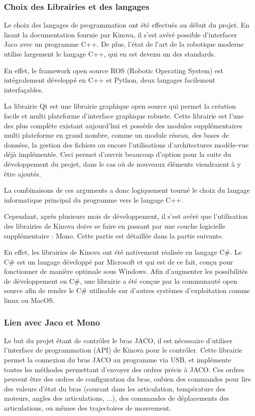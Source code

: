 \documentclass[letterpaper, twoside, 12pt, memoire, creativecommons, hyperref]{thETS}
\begin{document}
\subsubsection{Choix des Librairies et des langages}

Le choix des langages de programmation ont été effectués au début du projet. En lisant la documentation fournie par Kinova, il s'est avéré possible d'interfacer Jaco avec un programme C++. De plus, l'état de l'art de la robotique moderne utilise largement le langage C++, qui en est devenu un des standards. 

En effet, le framework open source ROS (Robotic Operating System) est intégralement développé en C++ et Python, deux langages facilement interfaçables. 

La librairie Qt est une librairie graphique open source qui permet la création facile et multi plateforme d'interface graphique robuste. Cette librairie est l'une des plus complète existant aujourd'hui et possède des modules supplémentaires multi plateforme en grand nombre, comme un module réseau, des bases de données, la gestion des fichiers ou encore l'utilisations d'architectures modèle-vue déjà implémentés. Ceci permet d'ouvrir beaucoup d'option pour la suite du développement du projet, dans le cas où de nouveaux éléments viendraient à y être ajoutés. 

La combinaisons de ces arguments a donc logiquement tourné le choix du langage informatique principal du programme vers le langage C++.

Cependant, après plusieurs mois de développement, il s'est avéré que l'utilisation des librairies de Kinova doive se faire en passant par une couche logicielle supplémentaire : Mono. Cette partie est détaillée dans la partie suivante.

En effet, les librairies de Kinova ont été nativement réalisée en langage C\#. Le C\# est un langage développé par Microsoft et qui est de ce fait, conçu pour fonctionner de manière optimale sous Windows. Afin d'augmenter les possibilités de développement en C\#, une librairie a été conçue par la communauté open source afin de rendre le C\# utilisable sur d'autres systèmes d'exploitation comme linux ou MacOS.  

\subsubsection{Lien avec Jaco et Mono}\label{CHMono}

Le but du projet étant de contrôler le bras JACO, il est nécessaire d’utiliser l’interface de programmation (API) de Kinova pour le contrôler. Cette librairie permet la connexion du bras JACO au programme via USB, et implémente toutes les méthodes permettant d'envoyer des ordres précis à JACO. Ces ordres peuvent être des ordres de configuration du bras, oubien des commandes pour lire des valeurs d'état du bras (courant dans les articulation, température des moteurs, angles des articulations, ...), des commandes de déplacements des articulations, ou mêmes des trajectoires de mouvement. 
\end{document}
